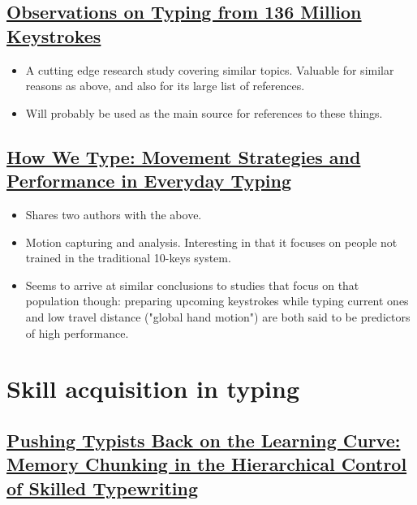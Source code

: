 \documentclass[11pt]{article}
\begin{document}
\subsection{\href{https://userinterfaces.aalto.fi/136Mkeystrokes/resources/chi-18-analysis.pdf}{Observations on Typing from 136 Million Keystrokes}}
\label{sec:orgf42400d}

\begin{itemize}
\item A cutting edge research study covering similar topics. Valuable for similar reasons as above, and also for its large list of references.
\item Will probably be used as the main source for references to these things.
\end{itemize}

\subsection{\href{http://delivery.acm.org/10.1145/2860000/2858233/p4262-feit.pdf?ip=71.12.145.131\&id=2858233\&acc=OA\&key=4D4702B0C3E38B35\%2E4D4702B0C3E38B35\%2E4D4702B0C3E38B35\%2EBA9FD68CFF7EBD7B\&\_\_acm\_\_=1531110151\_c810200d84c7d418a4ab994f974c2bce}{How We Type: Movement Strategies and Performance in Everyday Typing}}
\label{sec:org1958336}

\begin{itemize}
\item Shares two authors with the above.
\item Motion capturing and analysis. Interesting in that it focuses on people not trained in the traditional 10-keys system.
\item Seems to arrive at similar conclusions to studies that focus on that population though: preparing upcoming keystrokes while typing current ones and low travel distance ("global hand motion") are both said to be predictors of high performance.
\end{itemize}

\section{Skill acquisition in typing}
\label{sec:orgd7558e4}

\subsection{\href{https://www.researchgate.net/publication/304362539\_Pushing\_Typists\_Back\_on\_the\_Learning\_Curve\_Memory\_Chunking\_in\_the\_Hierarchical\_Control\_of\_Skilled\_Typewriting}{Pushing Typists Back on the Learning Curve: Memory Chunking in the Hierarchical Control of Skilled Typewriting}}
\label{sec:org9207b28}
\end{document}
